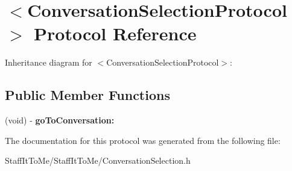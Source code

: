 \hypertarget{protocol_conversation_selection_protocol-p}{
\section{$<$\-Conversation\-Selection\-Protocol$>$ \-Protocol \-Reference}
\label{protocol_conversation_selection_protocol-p}
}


\-Inheritance diagram for $<$\-Conversation\-Selection\-Protocol$>$\-:
\subsection*{\-Public \-Member \-Functions}
\begin{DoxyCompactItemize}
\item 
\hypertarget{protocol_conversation_selection_protocol-p_a0d4b1c66124587f4cb30b3b82b07a250}{
(void) -\/ {\bfseries go\-To\-Conversation\-:}}
\label{protocol_conversation_selection_protocol-p_a0d4b1c66124587f4cb30b3b82b07a250}

\end{DoxyCompactItemize}


\-The documentation for this protocol was generated from the following file\-:\begin{DoxyCompactItemize}
\item 
\-Staff\-It\-To\-Me/\-Staff\-It\-To\-Me/\-Conversation\-Selection.\-h\end{DoxyCompactItemize}
